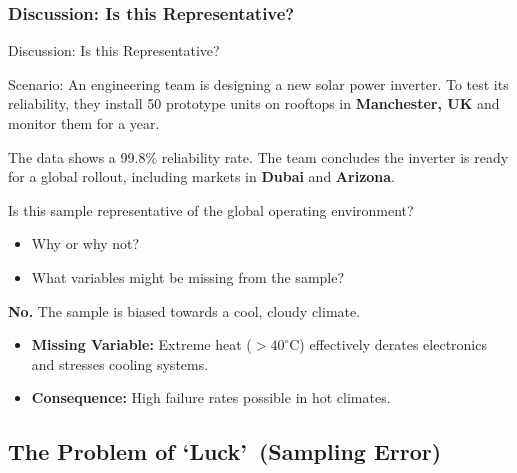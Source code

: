 \subsubsection{Discussion: Is this Representative?}
\begin{frame}[allowframebreaks]{Discussion: Is this Representative?}


\begin{example}
Scenario:
    An engineering team is designing a new solar power inverter. To test its reliability, they install 50 prototype units on rooftops in \textbf{Manchester, UK} and monitor them for a year. 
    
    The data shows a 99.8\% reliability rate. The team concludes the inverter is ready for a global rollout, including markets in \textbf{Dubai} and \textbf{Arizona}.
    
        Is this sample representative of the global operating environment? 
        \begin{itemize}
            \item Why or why not?
            \item What variables might be missing from the sample?
        \end{itemize}
\end{example}



    \pause %

\begin{solution}
        \textbf{No.} The sample is biased towards a cool, cloudy climate.
        \begin{itemize}
            \item \textbf{Missing Variable:} Extreme heat ($>40^\circ$C) effectively derates electronics and stresses cooling systems.
            \item \textbf{Consequence:} High failure rates possible in hot climates.
        \end{itemize}
    \end{solution}
\end{frame}

\subsection{The Problem of \lq Luck\rq\ (Sampling Error)}

